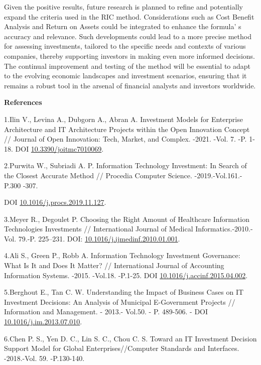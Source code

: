 {Given the positive results, future research is planned to refine and
potentially expand the criteria used in the RIC method. Considerations
such as Cost Benefit Analysis and Return on Assets could be integrated
to enhance the formula' s accuracy and relevance. Such
developments could lead to a more precise method for assessing
investments, tailored to the specific needs and contexts of various
companies, thereby supporting investors in making even more informed
decisions. The continual improvement and testing of the method will be
essential to adapt to the evolving economic landscapes and investment
scenarios, ensuring that it remains a robust tool in the arsenal of
financial analysts and investors worldwide.

{\bfseries References}

1.Ilin V., Levina A., Dubgorn A., Abran A. Investment Models for
Enterprise Architecture and IT Architecture Projects within the Open
Innovation Concept // Journal of Open Innovation: Tech, Market, and
Complex. -2021. -Vol. 7. -P. 1-18. DOI
\href{https://doi.org/10.3390/joitmc7010069}{10.3390/joitmc7010069}.

2.Purwita W., Subriadi A. P. Information Technology Investment: In
Search of the Closest Accurate Method // Procedia Computer Science.
-2019.-Vol.161.-P.300 -307.

DOI
\href{https://doi.org/10.1016/j.procs.2019.11.127}{10.1016/j.procs.2019.11.127}.

3.Meyer R., Degoulet P. Choosing the Right Amount of Healthcare
Information Technologies Investments // International Journal of Medical
Informatics.-2010.- Vol. 79.-P. 225--231. DOI:
\href{https://doi.org/10.1016/j.ijmedinf.2010.01.001}{10.1016/j.ijmedinf.2010.01.001}.

4.Ali S., Green P., Robb A. Information Technology Investment
Governance: What Is It and Does It Matter? // International Journal of
Accounting Information Systems. -2015. -Vol.18. -P.1-25. DOI
\href{https://doi.org/10.1016/j.accinf.2015.04.002}{10.1016/j.accinf.2015.04.002}.

5.Berghout E., Tan C. W. Understanding the Impact of Business Cases on
IT Investment Decisions: An Analysis of Municipal E-Government Projects
// Information and Management. - 2013.- Vol.50. - P. 489-506. - DOI
\href{https://doi.org/10.1016/j.im.2013.07.010}{10.1016/j.im.2013.07.010}.

6.Chen P. S., Yen D. C., Lin S. C., Chou C. S. Toward an IT Investment
Decision Support Model for Global Enterprises//Computer Standards and
Interfaces. -2018.-Vol. 59. -P.130-140.

}
